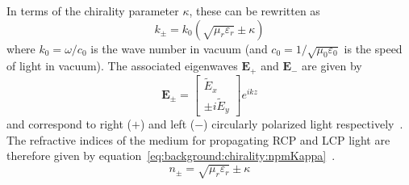 In terms of the chirality parameter $\kappa$, these can be rewritten as
\begin{equation}\label{eq:background:chirality:kpmKappa}
    {k_\pm } = {k_0}\left( {\sqrt {{\mu _r}{\varepsilon _r}}  \pm \kappa } \right)
\end{equation}
where $k_0=\omega / c_0$ is the wave number in vacuum (and $c_0=1/\sqrt {{\mu _0}{\varepsilon _0}}$ is the speed of light in vacuum). The associated eigenwaves $\mathbf{E}_+$ and $\mathbf{E}_-$ are given by
\begin{equation}
    \mathbf{E}_{\pm} = \begin{bmatrix}\tilde E_x\\ \pm i \tilde E_y\end{bmatrix} e^{i k z}
\end{equation}
and correspond to right ($+$) and left ($-$) circularly polarized light respectively~\cite[\S 2.2]{Lekner1999}\cite{Chern2013}.
The refractive indices of the medium for propagating RCP and LCP light are therefore given by equation~\ref{eq:background:chirality:npmKappa}~\cite{Capolino2009, Qiu2008, Valev2013b}. 
\begin{equation}\label{eq:background:chirality:npmKappa}
    {n_ \pm } = \sqrt {{\mu _r}{\varepsilon _r}}  \pm \kappa
\end{equation}



